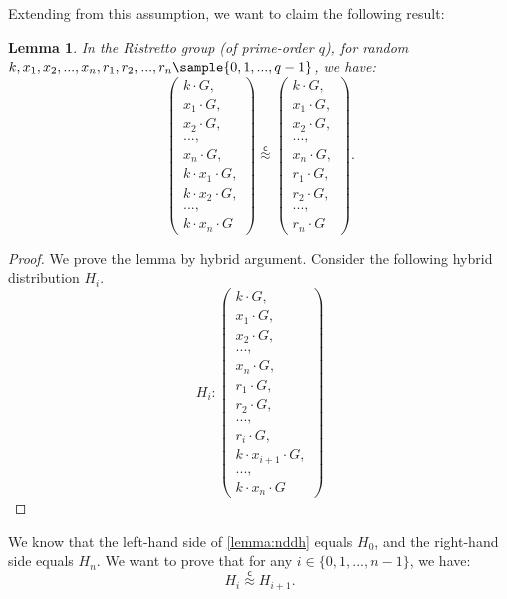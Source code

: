 \documentclass{article}
\newtheorem{lemma}{Lemma}
\begin{document}
Extending from this assumption, we want to claim the following result: 

\begin{lemma}
In the Ristretto group (of prime-order $q$), for random $k, x_1, x_2, ..., x_n, r_1, r_2, ...,\allowbreak r_n\sample\allowbreak\{0,\allowbreak1,\allowbreak...,\allowbreak q-1\}$, we have:
\[
\left(\begin{array}{r}
k\cdot G,\\
x_1\cdot G,\\
x_2\cdot G,\\
...,\\
x_n\cdot G,\\
k\cdot x_1\cdot G,\\
k\cdot x_2\cdot G,\\
...,\\
k\cdot x_n\cdot G
\end{array}\right)\stackrel{\mathsf{c}}{\approx}\left(\begin{array}{l}
k\cdot G,\\
x_1\cdot G,\\
x_2\cdot G,\\
...,\\
x_n\cdot G,\\
r_1\cdot G,\\
r_2\cdot G,\\
...,\\
r_n\cdot G
\end{array}\right).
\]
\label{lemma:nddh}\end{lemma}

\begin{proof}
We prove the lemma by hybrid argument. Consider the following hybrid distribution $H_i$.
\[
H_i: \left(\begin{array}{l}
k\cdot G,\\
x_1\cdot G,\\
x_2\cdot G,\\
...,\\
x_n\cdot G,\\
r_1\cdot G,\\
r_2\cdot G,\\
...,\\
r_i\cdot G,\\
k\cdot x_{i+1} \cdot G,\\
...,\\
k\cdot x_{n}\cdot G
\end{array}\right)
\]
\end{proof}
We know that the left-hand side of \autoref{lemma:nddh} equals $H_0$, and the right-hand side equals $H_n$. We want to prove that for any $i\in\{0,1,...,n-1\}$, we have:
\[
H_{i}\stackrel{\mathsf{c}}{\approx}H_{i+1}.
\]
\end{document}
